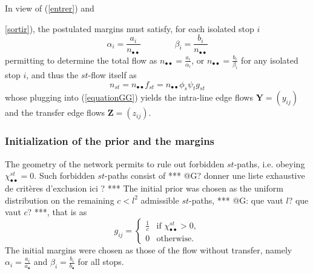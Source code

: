 \documentclass{bmcart}
\begin{document}
In view of (\ref{entrer}) and {\ref{sortir}), the postulated margins must satisfy, for each isolated stop $i$
\begin{equation}
\label{ }
\alpha_i=\frac{a_i}{n_{\bullet \bullet}}\qquad\qquad \beta_i=\frac{b_i}{n_{\bullet \bullet}}
\end{equation}
permitting to determine the total flow as $n_{\bullet \bullet}=\frac{a_i}{\alpha_i}$, or  $n_{\bullet \bullet}=\frac{b_i}{\beta_i}$ for any isolated stop $i$, and thus 
the $st$-flow itself as 
\begin{equation}
	\label{flow_from_distrib}
	n_{st} = n_{\bullet \bullet} f_{st}= n_{\bullet \bullet}\phi_s \psi_t g_{st} 
\end{equation}
whose plugging into (\ref{equationGG}) yields the intra-line edge flows $\mathbf{Y}=(y_{ij})$ and the transfer edge flows $\mathbf{Z}=(z_{ij})$.


\subsubsection{Initialization of the prior and the margins}
The geometry of the network permits to rule out forbidden $st$-paths, i.e. obeying  $\chi^{st}_{\bullet\bullet}=0$. Such forbidden $st$-paths consist of *** @G? donner une liste exhaustive de critères d'exclusion ici ? ***  The initial prior was chosen as the uniform distribution on the remaining $c<l^2$ admissible $st$-paths, *** @G: que vaut $l$? que vaut $c$? ***,  that is as
\begin{equation*}
g_{ij} = \begin{cases}
  \frac{1}{c}    & \text{if $\chi^{st}_{\bullet\bullet}>0$}, \\
  0    & \text{otherwise}.
\end{cases}
\end{equation*}
The initial margins were chosen as  those of the flow without transfer, namely $\alpha_i=\frac{a_i}{a_{\bullet}}$ and $\beta_i=\frac{b_i}{b_\bullet}$ for all stops. 



}
\end{document}
